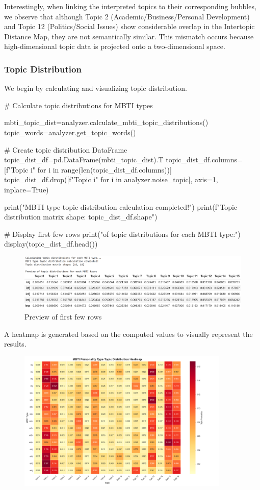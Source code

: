 \documentclass[12pt]{article}
\begin{document}
	Interestingly, when linking the interpreted topics to their corresponding bubbles, we observe that although Topic 2 (Academic/Business/Personal Development) and Topic 12 (Politics/Social Issues) show considerable overlap in the Intertopic Distance Map, they are not semantically similar. This mismatch occurs because high-dimensional topic data is projected onto a two-dimensional space. 
	
	
	\subsubsection{Topic Distribution}
	We begin by calculating and visualizing topic distribution.
	\begin{python}
# Calculate topic distributions for MBTI types

mbti_topic_dist=analyzer.calculate_mbti_topic_distributions()
topic_words=analyzer.get_topic_words()

# Create topic distribution DataFrame
topic_dist_df=pd.DataFrame(mbti_topic_dist).T
topic_dist_df.columns=[f"Topic {i}" for i in range(len(topic_dist_df.columns))]
topic_dist_df.drop([f"Topic {i}" for i in analyzer.noise_topic],
                   axis=1,
                   inplace=True)

print("MBTI type topic distribution calculation completed!")
print(f"Topic distribution matrix shape: {topic_dist_df.shape}")

# Display first few rows
print("\nPreview of topic distributions for each MBTI type:")
display(topic_dist_df.head())
	\end{python}
	\begin{figure}[H]
		\centering
		\includegraphics[width=1\textwidth]{Q2row} 
		\caption{\centering Preview of first few rows}		
	\end{figure}
	
	A heatmap is generated based on the computed values to visually represent the results.
	\begin{figure}[H]
		\centering
		\includegraphics[width=0.9\textwidth]{Q2hmap} 	
	\end{figure}
	
\end{document}
